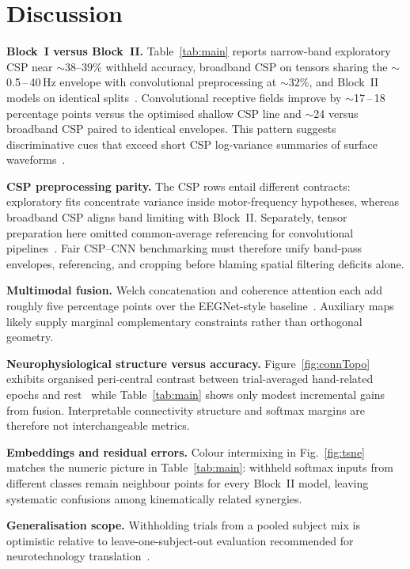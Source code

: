 \section{Discussion}
\label{sec:discussion}

\textbf{Block~I versus Block~II.}
Table~\ref{tab:main} reports narrow-band exploratory CSP near \(\sim 38\mbox{--}39\%\) withheld accuracy, broadband CSP on tensors sharing the \(\sim\)0.5\,--\,40\,Hz envelope with convolutional preprocessing at \(\sim 32\%\), and Block~II models on identical splits~\cite{gramfort2013meg,lawhern2018eegnet}.
Convolutional receptive fields improve by \(\sim\)17\,--\,18 percentage points versus the optimised shallow CSP line and \(\sim\)24 versus broadband CSP paired to identical envelopes.
This pattern suggests discriminative cues that exceed short CSP log-variance summaries of surface waveforms~\cite{gramfort2013meg}.

\textbf{CSP preprocessing parity.}
The CSP rows entail different contracts: exploratory fits concentrate variance inside motor-frequency hypotheses, whereas broadband CSP aligns band limiting with Block~II.
Separately, tensor preparation here omitted common-average referencing for convolutional pipelines~\cite{gramfort2013meg}.
Fair CSP--CNN benchmarking must therefore unify band-pass envelopes, referencing, and cropping before blaming spatial filtering deficits alone.

\textbf{Multimodal fusion.}
Welch concatenation and coherence attention each add roughly five percentage points over the EEGNet-style baseline~\cite{lawhern2018eegnet}.
Auxiliary maps likely supply marginal complementary constraints rather than orthogonal geometry.

\textbf{Neurophysiological structure versus accuracy.}
Figure~\ref{fig:connTopo} exhibits organised peri-central contrast between trial-averaged hand-related epochs and rest~\cite{ofner2017upper} while Table~\ref{tab:main} shows only modest incremental gains from fusion.
Interpretable connectivity structure and softmax margins are therefore not interchangeable metrics.

\textbf{Embeddings and residual errors.}
Colour intermixing in Fig.~\ref{fig:tsne} matches the numeric picture in Table~\ref{tab:main}: withheld softmax inputs from different classes remain neighbour points for every Block~II model, leaving systematic confusions among kinematically related synergies.

\textbf{Generalisation scope.}
Withholding trials from a pooled subject mix is optimistic relative to leave-one-subject-out evaluation recommended for neurotechnology translation~\cite{ofner2017upper}.

